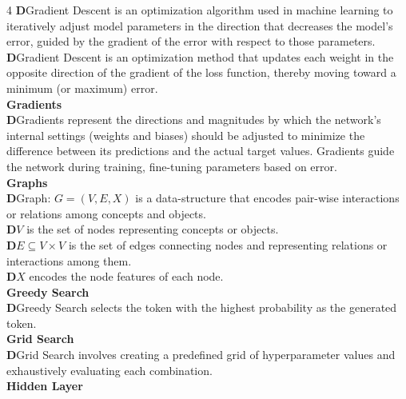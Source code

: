 \documentclass[8pt]{extarticle}
\newcommand{\dtag}{\textcolor{definitioncolor}{\tiny\textbf{D}}\;}
\begin{document}
\begin{multicols}{4}
\dtag Gradient Descent is an optimization algorithm used in machine learning to iteratively adjust model parameters in the direction that decreases the model's error, guided by the gradient of the error with respect to those parameters.\\
\dtag Gradient Descent is an optimization method that updates each weight in the opposite direction of the gradient of the loss function, thereby moving toward a minimum (or maximum) error.\\
\vspace{2pt}\textbf{Gradients}\\
\dtag Gradients represent the directions and magnitudes by which the network's internal settings (weights and biases) should be adjusted to minimize the difference between its predictions and the actual target values. Gradients guide the network during training, fine-tuning parameters based on error.\\
\vspace{2pt}\textbf{Graphs}\\
\dtag Graph: $G = (V, E, X)$ is a data-structure that encodes pair-wise interactions or relations among concepts and objects.\\
\dtag $V$ is the set of nodes representing concepts or objects.\\
\dtag $E \subseteq V \times V$ is the set of edges connecting nodes and representing relations or interactions among them.\\
\dtag $X$ encodes the node features of each node.\\
\vspace{2pt}\textbf{Greedy Search}\\
\dtag Greedy Search selects the token with the highest probability as the generated token.\\
\vspace{2pt}\textbf{Grid Search}\\
\dtag Grid Search involves creating a predefined grid of hyperparameter values and exhaustively evaluating each combination.\\
\vspace{2pt}\textbf{Hidden Layer}\\


\end{multicols}
\end{document}
